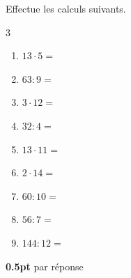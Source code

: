 \question[4\half]
Effectue les calculs suivants.


\vspace{10pt}
\setlength{\columnsep}{50pt}
\begin{multicols}{3}
\begin{enumerate}[leftmargin=*,align=parleft, label=\alph*), itemsep=15pt]
\item $13 \cdot 5 =$ 
\item $63 : 9=$ 
\item $3 \cdot 12=$ 
\item $32 : 4=$ 
\item $13 \cdot 11=$ 
\item $2 \cdot 14=$ 
\item $60 : 10=$ 
\item $56 : 7=$ 
\item $144 : 12=$ 
\end{enumerate}
\end{multicols}
\setlength{\columnsep}{10pt}

\begin{solution}[0pt]
\textbf{0.5pt} par réponse
\end{solution}
